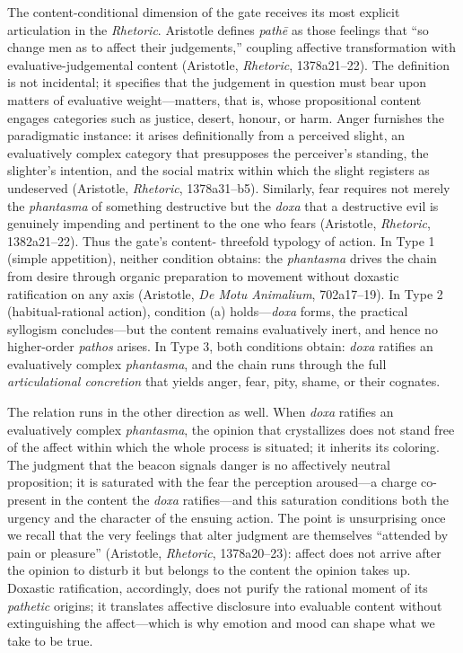\documentclass{article}
\begin{document}
The content-conditional dimension of the gate receives its most explicit articulation in the \textit{Rhetoric}. Aristotle defines \textit{pathē} as those feelings that ``so change men as to affect their judgements,'' coupling affective transformation with evaluative-judgemental content (Aristotle, \textit{Rhetoric}, 1378a21--22). The definition is not incidental; it specifies that the judgement in question must bear upon matters of evaluative weight---matters, that is, whose propositional content engages categories such as justice, desert, honour, or harm. Anger furnishes the paradigmatic instance: it arises definitionally from a perceived slight, an evaluatively complex category that presupposes the perceiver's standing, the slighter's intention, and the social matrix within which the slight registers as undeserved (Aristotle, \textit{Rhetoric}, 1378a31--b5). Similarly, fear requires not merely the \textit{phantasma} of something destructive but the \textit{doxa} that a destructive evil is genuinely impending and pertinent to the one who fears (Aristotle, \textit{Rhetoric}, 1382a21--22). Thus the gate's content- threefold typology of action. In Type 1 (simple appetition), neither condition obtains: the \textit{phantasma} drives the chain from desire through organic preparation to movement without doxastic ratification on any axis (Aristotle, \textit{De Motu Animalium}, 702a17--19). In Type 2 (habitual-rational action), condition (a) holds---\textit{doxa} forms, the practical syllogism concludes---but the content remains evaluatively inert, and hence no higher-order \textit{pathos} arises. In Type 3, both conditions obtain: \textit{doxa} ratifies an evaluatively complex \textit{phantasma}, and the chain runs through the full \textit{articulational concretion} that yields anger, fear, pity, shame, or their cognates.

The relation runs in the other direction as well. When \textit{doxa} ratifies an evaluatively complex \textit{phantasma}, the opinion that crystallizes does not stand free of the affect within which the whole process is situated; it inherits its coloring. The judgment that the beacon signals danger is no affectively neutral proposition; it is saturated with the fear the perception aroused---a charge co-present in the content the \textit{doxa} ratifies---and this saturation conditions both the urgency and the character of the ensuing action. The point is unsurprising once we recall that the very feelings that alter judgment are themselves ``attended by pain or pleasure'' (Aristotle, \textit{Rhetoric}, 1378a20--23): affect does not arrive after the opinion to disturb it but belongs to the content the opinion takes up. Doxastic ratification, accordingly, does not purify the rational moment of its \textit{pathetic} origins; it translates affective disclosure into evaluable content without extinguishing the affect---which is why emotion and mood can shape what we take to be true.
\end{document}
